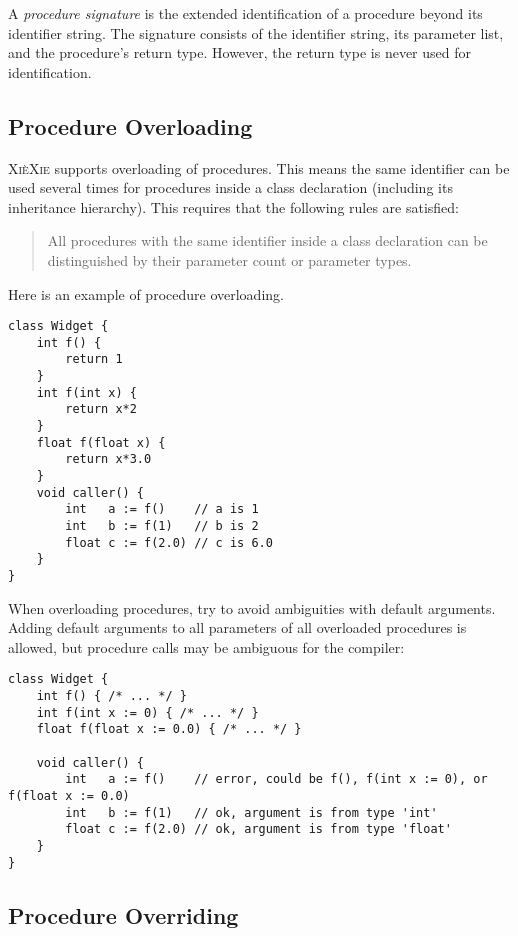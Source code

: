 \documentclass{report}
\def\xiexie{\textsc{Xi\`eXie}\xspace}
\begin{document}
A \textit{procedure signature} is the extended identification of a procedure beyond its identifier string.
The signature consists of the identifier string, its parameter list, and the procedure's return type.
However, the return type is never used for identification.

\subsection{Procedure Overloading}

\xiexie supports overloading of procedures. This means the same identifier can be used several times
for procedures inside a class declaration (including its inheritance hierarchy).
This requires that the following rules are satisfied:
\begin{quote}
	All procedures with the same identifier inside a class declaration can be distinguished by their
	parameter count or parameter types.
\end{quote}
Here is an example of procedure overloading.
\begin{lstlisting}
class Widget {
    int f() {
        return 1
    }
    int f(int x) {
        return x*2
    }
    float f(float x) {
        return x*3.0
    }
    void caller() {
        int   a := f()    // a is 1
        int   b := f(1)   // b is 2
        float c := f(2.0) // c is 6.0
    }
}
\end{lstlisting}
When overloading procedures, try to avoid ambiguities with default arguments. Adding default arguments
to all parameters of all overloaded procedures is allowed, but procedure calls may be ambiguous for the compiler:
\begin{lstlisting}
class Widget {
    int f() { /* ... */ }
    int f(int x := 0) { /* ... */ }
    float f(float x := 0.0) { /* ... */ }
    
    void caller() {
        int   a := f()    // error, could be f(), f(int x := 0), or f(float x := 0.0)
        int   b := f(1)   // ok, argument is from type 'int'
        float c := f(2.0) // ok, argument is from type 'float'
    }
}
\end{lstlisting}

\subsection{Procedure Overriding}
\end{document}
